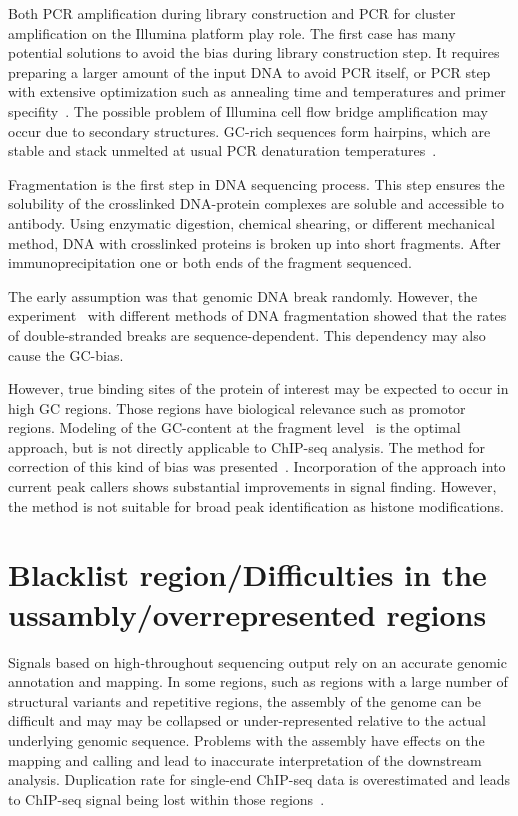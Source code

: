 Both PCR amplification during library construction and PCR for cluster amplification on the Illumina platform play role. 
The first case has many potential solutions to avoid the bias during library construction step.
It requires preparing a larger amount of the input DNA to avoid PCR itself, or PCR step with extensive optimization such as annealing time and temperatures and primer specifity~\cite{aird2011analyzing}.
The possible problem of Illumina cell flow bridge amplification may occur due to secondary structures.
GC-rich sequences form hairpins, which are stable and stack unmelted at usual PCR denaturation temperatures~\cite{stein2010nucleosome}.

Fragmentation is the first step in DNA sequencing process.
This step ensures the solubility of the crosslinked DNA-protein complexes are soluble and accessible to antibody.
Using enzymatic digestion, chemical shearing, or different mechanical method, DNA with crosslinked proteins is broken up into short fragments.
After immunoprecipitation one or both ends of the fragment sequenced.


The early assumption was that genomic DNA break randomly.
However, the experiment~\cite{poptsova2014non} with different methods of DNA fragmentation showed that the rates of double-stranded breaks are sequence-dependent.
This dependency may also cause the GC-bias. 

However, true binding sites of the protein of interest may be expected to occur in high GC regions.
Those regions have biological relevance such as promotor regions.
Modeling of the GC-content at the fragment level~\cite{benjamini2012summarizing} is the optimal approach, but is not directly applicable to ChIP-seq analysis.
The method for correction of this kind of bias was presented~\cite{teng2017accounting}.
Incorporation of the approach into current peak callers shows substantial improvements in signal finding.
However, the method is not suitable for broad peak identification as histone modifications.






\section{Blacklist region/Difficulties in the ussambly/overrepresented regions}

Signals based on high-throughout sequencing output rely on an accurate genomic annotation and mapping.
In some regions, such as regions with a large number of structural variants and repetitive regions, the assembly of the genome can be difficult and may may be collapsed or under-represented relative to the actual underlying genomic sequence.
Problems with the assembly have effects on the mapping and calling and lead to inaccurate interpretation of the downstream analysis.
Duplication rate for single-end ChIP-seq data is overestimated and leads to ChIP-seq signal being lost within those regions~\cite{chen2012systematic}.
